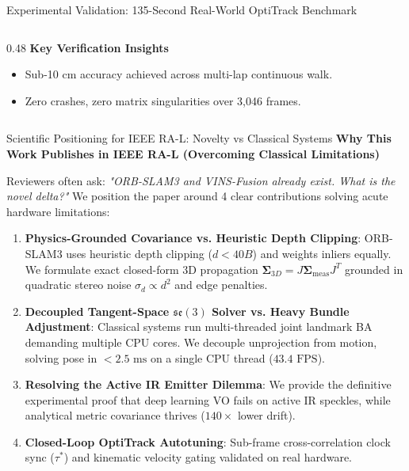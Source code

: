 \documentclass[aspectratio=169, 10pt]{beamer}
\begin{document}
\begin{frame}{Experimental Validation: 135-Second Real-World OptiTrack Benchmark}
\begin{columns}[T]
\begin{column}{0.48\textwidth}
      {\small \textbf{\textcolor{EmeraldGreen}{Key Verification Insights}}}
      \begin{itemize}
        \setlength{\itemsep}{1.5pt}
        \item Sub-10 cm accuracy achieved across multi-lap continuous walk.
        \item Zero crashes, zero matrix singularities over 3,046 frames.
      \end{itemize}
    \end{column}
  \end{columns}
\end{frame}

\begin{frame}{Scientific Positioning for IEEE RA-L: Novelty vs Classical Systems}
  {\normalsize \textbf{\textcolor{NavyBlue}{Why This Work Publishes in IEEE RA-L (Overcoming Classical Limitations)}}}
  \vspace{0.15cm}

  Reviewers often ask: \textit{"ORB-SLAM3 and VINS-Fusion already exist. What is the novel delta?"}
  We position the paper around 4 clear contributions solving acute hardware limitations:
  \vspace{0.15cm}

  \begin{enumerate}
    \setlength{\itemsep}{5pt}
    \item \textbf{Physics-Grounded Covariance vs. Heuristic Depth Clipping}:
      ORB-SLAM3 uses heuristic depth clipping ($d < 40B$) and weights inliers equally. We formulate exact closed-form 3D propagation $\mathbf{\Sigma}_{3D} = J \mathbf{\Sigma}_{\text{meas}} J^T$ grounded in quadratic stereo noise $\sigma_d \propto d^2$ and edge penalties.
    \item \textbf{Decoupled Tangent-Space $\mathfrak{se}(3)$ Solver vs. Heavy Bundle Adjustment}:
      Classical systems run multi-threaded joint landmark BA demanding multiple CPU cores. We decouple unprojection from motion, solving pose in $<2.5\text{ ms}$ on a single CPU thread ($43.4\text{ FPS}$).
    \item \textbf{Resolving the Active IR Emitter Dilemma}:
      We provide the definitive experimental proof that deep learning VO fails on active IR speckles, while analytical metric covariance thrives ($140\times$ lower drift).
    \item \textbf{Closed-Loop OptiTrack Autotuning}:
      Sub-frame cross-correlation clock sync ($\tau^*$) and kinematic velocity gating validated on real hardware.
  \end{enumerate}
\end{frame}
\end{document}
